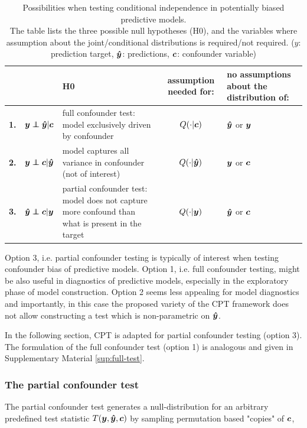 \documentclass{article}
\begin{document}
\renewcommand{\arraystretch}{1.2}
\begin{table}[]
\centering
\begin{tabular}{l|rp{60mm}|c|>{\centering\arraybackslash}m{30mm}}
 &  & H0  & assumption needed for: & no assumptions about the distribution of: \\
\hline
\textbf{1.} & $\y \independent \yhat | \c$ \quad  & full confounder test: model exclusively driven by confounder & $Q(\cdot|\boldsymbol{c})$ & $\boldsymbol{\hat{y}}$ or $\boldsymbol{y}$ \\
\textbf{2.} & $\y \independent \c | \yhat$ \quad & model captures all variance in confounder (not of interest) & $Q(\cdot|\boldsymbol{\hat{y}})$ & $\boldsymbol{y}$ or $\boldsymbol{c}$ \\
\textbf{3.} & $\yhat \independent \c | \y$  \quad &  partial confounder  test: model does not capture more confound than what is present in the target & $Q(\cdot|\boldsymbol{y})$ & $\boldsymbol{\hat{y}}$ or $\boldsymbol{c}$ \\
\end{tabular}
\caption{\label{tab:conditional-independence-cases} Possibilities when testing conditional independence in potentially biased predictive models. \\The table lists the three possible null hypotheses (H0), and the variables where assumption about the joint/conditional distributions is required/not required.   ($y$: prediction target, $\boldsymbol{\hat{y}}$: predictions, $\boldsymbol{c}$: confounder variable) }
\end{table}

Option 3, i.e. partial confounder testing is typically of interest when testing confounder bias of predictive models. Option 1, i.e. full confounder testing, might be also useful in diagnostics of predictive models, especially in the exploratory phase of model construction. Option 2 seems less appealing for model diagnostics and importantly, in this case the proposed variety of the CPT framework does not allow constructing a test which is non-parametric on $\boldsymbol{\hat{y}}$.

In the following section, CPT is adapted for partial confounder testing (option 3). The formulation of the full confounder test (option 1) is analogous and given in Supplementary Material \ref{sup:full-test}.
\subsubsection*{The partial confounder test}

The partial confounder test generates a null-distribution for an arbitrary predefined test statistic $T(\boldsymbol{y},\boldsymbol{\hat{y}},\boldsymbol{c})$ by sampling permutation based "copies" of $\boldsymbol{c}$,
\end{document}
